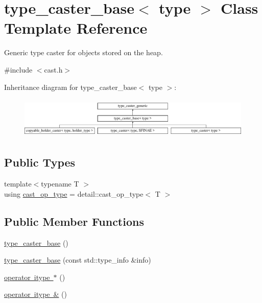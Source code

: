 \hypertarget{classtype__caster__base}{}\section{type\+\_\+caster\+\_\+base$<$ type $>$ Class Template Reference}
\label{classtype__caster__base}


Generic type caster for objects stored on the heap.  




{\ttfamily \#include $<$cast.\+h$>$}

Inheritance diagram for type\+\_\+caster\+\_\+base$<$ type $>$\+:\begin{figure}[H]
\begin{center}
\leavevmode
\includegraphics[height=1.992882cm]{classtype__caster__base}
\end{center}
\end{figure}
\subsection*{Public Types}
\begin{DoxyCompactItemize}
\item 
{\footnotesize template$<$typename T $>$ }\\using \mbox{\hyperlink{classtype__caster__base_aaa39552464f51c50eec989142f3568a5}{cast\+\_\+op\+\_\+type}} = detail\+::cast\+\_\+op\+\_\+type$<$ T $>$
\end{DoxyCompactItemize}
\subsection*{Public Member Functions}
\begin{DoxyCompactItemize}
\item 
\mbox{\hyperlink{classtype__caster__base_af0269903887f3e6cdfdfa761a51d4246}{type\+\_\+caster\+\_\+base}} ()
\item 
\mbox{\hyperlink{classtype__caster__base_af4a4330eee584b6dbd6f081989e3ac3b}{type\+\_\+caster\+\_\+base}} (const std\+::type\+\_\+info \&info)
\item 
\mbox{\hyperlink{classtype__caster__base_a85b59a4a11dff7fe2a8c57212f3da388}{operator itype $\ast$}} ()
\item 
\mbox{\hyperlink{classtype__caster__base_a4d96130f31bfce209074d07e7adfd5dd}{operator itype \&}} ()
\end{DoxyCompactItemize}
